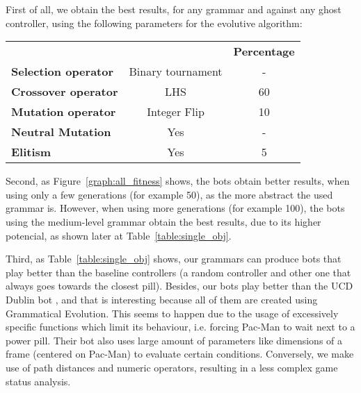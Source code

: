 First of all, we obtain the best results, for any grammar and against any ghost controller, using the following parameters for the evolutive algorithm:
\begin{table}[H]
\centering
\begin{tabular}{lcc}
\cline{3-3}
                                                   &                                                               & \textbf{Percentage} \\ \cline{3-3} 
\multicolumn{1}{|l|}{\textbf{Selection operator}} & Binary tournament \footnotemark & -                   \\
\multicolumn{1}{|l|}{\textbf{Crossover operator}}     & LHS                                                           & 60                  \\
\multicolumn{1}{|l|}{\textbf{Mutation operator}}  & Integer Flip                                                  & 10                  \\
\multicolumn{1}{|l|}{\textbf{Neutral Mutation}}    & Yes                                                            & -                   \\
\multicolumn{1}{|l|}{\textbf{Elitism}}            & Yes                                                            & 5                  
\end{tabular}
\end{table}

Second, as Figure~\ref{graph:all_fitness} shows, the bots obtain better results, when using only a few generations (for example 50), as the more abstract the used grammar is. However, when using more generations (for example 100), the bots using the medium-level grammar obtain the best results, due to its higher potencial, as shown later at Table~\ref{table:single_obj}.
 
Third, as Table~\ref{table:single_obj} shows, our grammars can produce bots that play better than the baseline controllers (a random controller and other one that always goes towards the closest pill). Besides, our bots play better than the UCD Dublin bot \cite{galvan2010evolving}, and that is interesting because all of them are created using Grammatical Evolution. This seems to happen due to the usage of excessively specific functions which limit its behaviour, i.e. forcing Pac-Man to wait next to a power pill. Their bot also uses large amount of parameters like dimensions of a frame (centered on Pac-Man) to evaluate certain conditions. Conversely, we make use of path distances and numeric operators, resulting in a less complex game status analysis.

